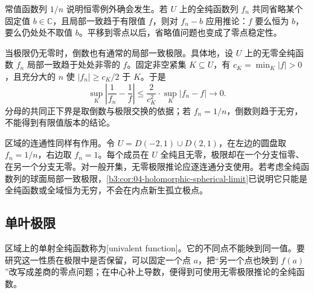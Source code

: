 常值函数列 \(1/n\) 说明恒零例外确会发生。若 \(U\) 上的全纯函数列 \(f_n\) 共同省略某个固定值 \(b\in\mathbb C\)，且局部一致趋于有限值 \(f\)，则对 \(f_n-b\) 应用推论：\(f\) 要么恒为 \(b\)，要么仍处处不取值 \(b\)。平移到零点以后，省略值问题也变成了零点稳定性。

\ProseParagraphBreak

当极限仍无零时，倒数也有通常的局部一致极限。具体地，设 \(U\) 上的无零全纯函数 \(f_n\) 局部一致趋于处处非零的 \(f\)。固定非空紧集 \(K\subseteq U\)，有 \(c_K=\min_K|f|>0\)，且充分大的 \(n\) 使 \(|f_n|\ge c_K/2\) 于 \(K\)。于是
\[
 \sup_K\left|\frac1{f_n}-\frac1f\right|
 \le\frac2{c_K^2}\cdot\sup_K|f_n-f|\longrightarrow0.
\]
分母的共同正下界是取倒数与极限交换的依据；若 \(f_n=1/n\)，倒数则趋于无穷，不能得到有限值版本的结论。

\ProseParagraphBreak

区域的连通性同样有作用。令 \(U=D(-2,1)\cup D(2,1)\)，在左边的圆盘取 \(f_n=1/n\)，右边取 \(f_n=1\)。每个成员在 \(U\) 全纯且无零，极限却在一个分支恒零、在另一个分支无零。对一般开集，无零极限推论应逐连通分支使用。若考虑全纯函数列的球面局部一致极限，\cref{b3:cor:04-holomorphic-spherical-limit}已说明它只能是全纯函数或全域恒为无穷，不会在内点新生孤立极点。

\subsection{单叶极限}
\label{b3:subsec:040403}

区域上的单射全纯函数称为[univalent function]。它的不同点不能映到同一值。要研究这一性质在极限中是否保留，可以固定一个点 \(a\)，把“另一个点也映到 \(f(a)\)”改写成差商的零点问题；在中心补上导数，便得到可使用无零极限推论的全纯函数。

